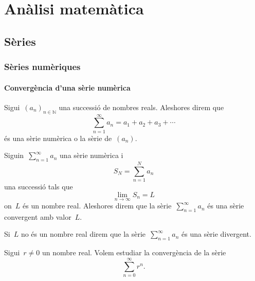 \documentclass[../../main.tex]{subfiles}
\begin{document}
\part{Anàlisi matemàtica}
\chapter{Sèries}
\section{Sèries numèriques}
    \subsection{Convergència d'una sèrie numèrica}
    \begin{definition}
        \label{def:serie-numerica}
        Sigui~\((a_{n})_{n\in\mathbb{N}}\) una successió de nombres reals.
        Aleshores direm que
        \[
            \sum_{n=1}^{\infty}a_{n}=a_{1}+a_{2}+a_{3}+\cdots
        \]
        és una sèrie numèrica o la sèrie de~\((a_{n})\).
    \end{definition}
    \begin{definition}
        \label{def:serie-convergent}
        \label{def:serie-divergent}
        Siguin~\(\sum_{n=1}^{\infty}a_{n}\) una sèrie numèrica i
        \[
            S_{N}=\sum_{n=1}^{N}a_{n}
        \]
        una successió tals que
        \[
            \lim_{n\to\infty}S_{n}=L
        \]
        on~\(L\) és un nombre real.
        Aleshores direm que la sèrie~\(\sum_{n=1}^{\infty}a_{n}\) és una sèrie convergent amb valor~\(L\).

        Si~\(L\) no és un nombre real direm que la sèrie~\(\sum_{n=1}^{\infty}a_{n}\) és una sèrie divergent.
    \end{definition}
    \begin{example}
        \label{ex:series-geometriques}
        Sigui~\(r\neq0\) un nombre real.
        Volem estudiar la convergència de la sèrie
        \begin{equation}
            \label{ex:series-geometriques:eq1}
            \sum_{n=0}^{\infty}r^{n}.
        \end{equation}
    \end{example}
\end{document}
